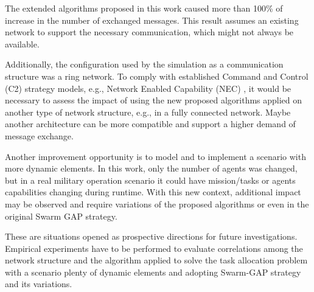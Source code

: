 The extended algorithms proposed in this work caused more than 100\% of increase in the number of exchanged messages. This result assumes an existing network to support the necessary communication, which might not always be available. 

Additionally, the configuration used by the simulation as a communication structure was a ring network. To comply with established Command and Control (C2) strategy models, e.g., Network Enabled Capability (NEC) \cite{CC01}, it would be necessary to assess the impact of using the new proposed algorithms applied on another type of network structure, e.g., in a fully connected network. Maybe another architecture can be more compatible and support a higher demand of message exchange.

Another improvement opportunity is to model and to implement a scenario with more dynamic elements. In this work, only the number of agents was changed, but in a real military operation scenario it could have mission/tasks or agents capabilities changing during runtime. With this new context, additional impact may be observed and require variations of the proposed algorithms or even in the original Swarm GAP strategy.

These are situations opened as prospective directions for future investigations. Empirical experiments have to be performed to evaluate correlations among the network structure and the algorithm applied to solve the task allocation problem with a scenario plenty of dynamic elements and adopting Swarm-GAP strategy and its variations.
